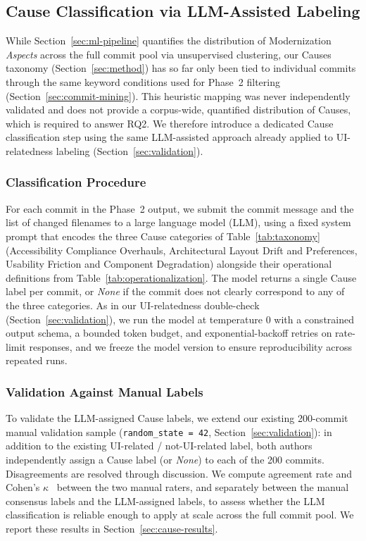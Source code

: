 \documentclass{article}
\begin{document}
\subsection{Cause Classification via LLM-Assisted Labeling}
\label{sec:cause-classification}

While Section~\ref{sec:ml-pipeline} quantifies the distribution of
Modernization \emph{Aspects} across the full commit pool via unsupervised
clustering, our Causes taxonomy (Section~\ref{sec:method}) has so far only
been tied to individual commits through the same keyword conditions used
for Phase~2 filtering (Section~\ref{sec:commit-mining}). This heuristic
mapping was never independently validated and does not provide a
corpus-wide, quantified distribution of Causes, which is required to
answer RQ2. We therefore introduce a dedicated Cause classification step
using the same LLM-assisted approach already applied to UI-relatedness
labeling (Section~\ref{sec:validation}).

\subsubsection{Classification Procedure}

For each commit in the Phase~2 output, we submit the commit message and
the list of changed filenames to a large language model (LLM), using a
fixed system prompt that encodes the three Cause categories of
Table~\ref{tab:taxonomy} (Accessibility Compliance Overhauls,
Architectural Layout Drift and Preferences, Usability Friction and
Component Degradation) alongside their operational definitions from
Table~\ref{tab:operationalization}. The model returns a single Cause
label per commit, or \emph{None} if the commit does not clearly
correspond to any of the three categories. As in our UI-relatedness
double-check (Section~\ref{sec:validation}), we run the model at
temperature $0$ with a constrained output schema, a bounded token budget,
and exponential-backoff retries on rate-limit responses, and we freeze the
model version to ensure reproducibility across repeated runs.

\subsubsection{Validation Against Manual Labels}
\label{sec:cause-validation}

To validate the LLM-assigned Cause labels, we extend our existing
200-commit manual validation sample (\texttt{random\_state = 42},
Section~\ref{sec:validation}): in addition to the existing UI-related /
not-UI-related label, both authors independently assign a Cause label
(or \emph{None}) to each of the 200 commits. Disagreements are resolved
through discussion. We compute agreement rate and Cohen's
$\kappa$~\cite{cohen1960} between the two manual raters, and separately
between the manual consensus labels and the LLM-assigned labels, to
assess whether the LLM classification is reliable enough to apply at
scale across the full commit pool. We report these results in
Section~\ref{sec:cause-results}.
\end{document}
